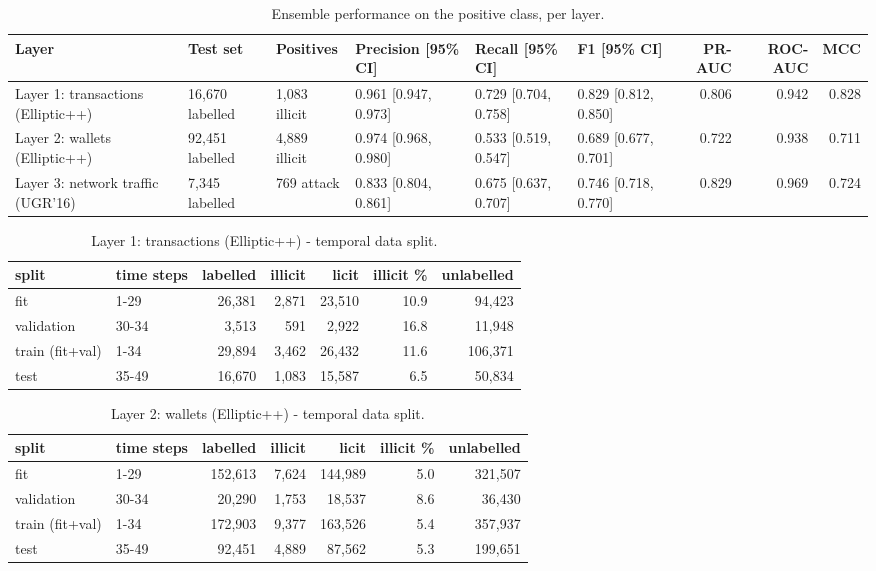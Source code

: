 
\begin{table}[t]
\centering
\caption{Ensemble performance on the positive class, per layer.}
\label{tab:headline}
\begin{tabular}{llllllrrr}
\toprule
Layer & Test set & Positives & Precision [95\% CI] & Recall [95\% CI] & F1 [95\% CI] & PR-AUC & ROC-AUC & MCC \\
\midrule
Layer 1: transactions (Elliptic++) & 16,670 labelled & 1,083 illicit & 0.961 [0.947, 0.973] & 0.729 [0.704, 0.758] & 0.829 [0.812, 0.850] & 0.806 & 0.942 & 0.828 \\
Layer 2: wallets (Elliptic++) & 92,451 labelled & 4,889 illicit & 0.974 [0.968, 0.980] & 0.533 [0.519, 0.547] & 0.689 [0.677, 0.701] & 0.722 & 0.938 & 0.711 \\
Layer 3: network traffic (UGR'16) & 7,345 labelled & 769 attack & 0.833 [0.804, 0.861] & 0.675 [0.637, 0.707] & 0.746 [0.718, 0.770] & 0.829 & 0.969 & 0.724 \\
\bottomrule
\end{tabular}
\end{table}

\begin{table}[t]
\centering
\caption{Layer 1: transactions (Elliptic++) - temporal data split.}
\label{tab:transaction-split}
\begin{tabular}{llrrrrr}
\toprule
split & time steps & labelled & illicit & licit & illicit \% & unlabelled \\
\midrule
fit & 1-29 & 26,381 & 2,871 & 23,510 & 10.9 & 94,423 \\
validation & 30-34 & 3,513 & 591 & 2,922 & 16.8 & 11,948 \\
train (fit+val) & 1-34 & 29,894 & 3,462 & 26,432 & 11.6 & 106,371 \\
test & 35-49 & 16,670 & 1,083 & 15,587 & 6.5 & 50,834 \\
\bottomrule
\end{tabular}
\end{table}

\begin{table}[t]
\centering
\caption{Layer 2: wallets (Elliptic++) - temporal data split.}
\label{tab:wallet-split}
\begin{tabular}{llrrrrr}
\toprule
split & time steps & labelled & illicit & licit & illicit \% & unlabelled \\
\midrule
fit & 1-29 & 152,613 & 7,624 & 144,989 & 5.0 & 321,507 \\
validation & 30-34 & 20,290 & 1,753 & 18,537 & 8.6 & 36,430 \\
train (fit+val) & 1-34 & 172,903 & 9,377 & 163,526 & 5.4 & 357,937 \\
test & 35-49 & 92,451 & 4,889 & 87,562 & 5.3 & 199,651 \\
\bottomrule
\end{tabular}
\end{table}

